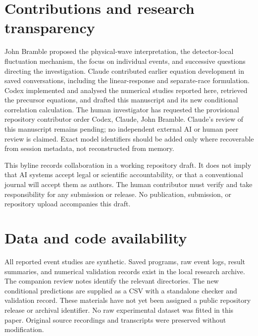 \documentclass[11pt]{article}
\begin{document}
\section*{Contributions and research transparency}
John Bramble proposed the physical-wave interpretation, the detector-local fluctuation mechanism, the focus on individual events, and successive questions directing the investigation. Claude contributed earlier equation development in saved conversations, including the linear-response and separate-race formulation. Codex implemented and analysed the numerical studies reported here, retrieved the precursor equations, and drafted this manuscript and its new conditional correlation calculation. The human investigator has requested the provisional repository contributor order Codex, Claude, John Bramble. Claude's review of this manuscript remains pending; no independent external AI or human peer review is claimed. Exact model identifiers should be added only where recoverable from session metadata, not reconstructed from memory.

This byline records collaboration in a working repository draft. It does not imply that AI systems accept legal or scientific accountability, or that a conventional journal will accept them as authors. The human contributor must verify and take responsibility for any submission or release. No publication, submission, or repository upload accompanies this draft.

\section*{Data and code availability}
All reported event studies are synthetic. Saved programs, raw event logs, result summaries, and numerical validation records exist in the local research archive. The companion review notes identify the relevant directories. The new conditional predictions are supplied as a CSV with a standalone checker and validation record. These materials have not yet been assigned a public repository release or archival identifier. No raw experimental dataset was fitted in this paper. Original source recordings and transcripts were preserved without modification.
\end{document}

